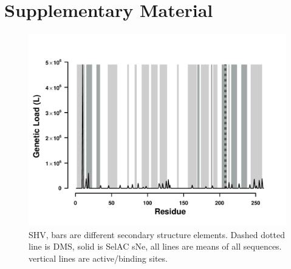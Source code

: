\documentclass[12pt]{article}
\begin{document}
\clearpage
\beginsupplement
\section*{Supplementary Material}


\begin{figure}[H]
     \centering
	\includegraphics[width=\textwidth]{img/GL_slide_SHV2016}
	\caption{SHV, bars are different secondary structure elements. Dashed dotted line is DMS, solid is SelAC sNe, all lines are means of all sequences. vertical lines are active/binding sites.}
	\label{fig:shv2016_sse}
\end{figure}
\end{document}
